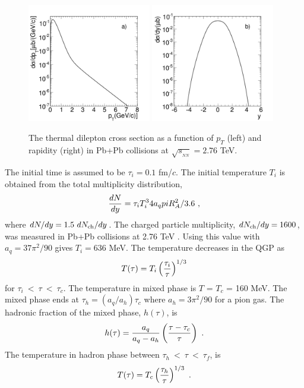 \begin{figure}
\includegraphics[width=0.48\textwidth]{chap_DiMuonContinuum_figures/Fig4a_ThPt}
\includegraphics[width=0.48\textwidth]{chap_DiMuonContinuum_figures/Fig4b_ThRap}

\caption{The thermal dilepton cross section as a function of $p_T$ 
(left) and rapidity (right) in Pb+Pb collisions at $\sqrt{s_{_{NN}}}= 2.76$ 
TeV.}
\label{Thermal}
\end{figure}

The initial time is assumed to be $\tau_i = 0.1$ fm/$c$. 
The initial temperature $T_i$ is obtained from
the total multiplicity distribution,
\begin{eqnarray}
{dN \over dy} = \tau_i T_i^3 4a_q \pi R_{A}^2/3.6 \, \, ,
\end{eqnarray}
where $dN/dy=1.5~dN_{\rm ch}/dy$. The charged particle multiplicity, 
$dN_{\rm ch}/dy = 1600$, was measured in Pb+Pb collisions 
at 2.76 TeV \cite{MULT}.  Using this value with $a_q = 37 \pi ^2 /90$ 
gives $T_i = 636$ MeV. 
The temperature decreases in the QGP as
\begin{eqnarray}
T(\tau) = T_i \left({\tau_i \over \tau}\right)^{1/3}
\end{eqnarray}
for $\tau_i~<~\tau~<~\tau_c$.  The temperature in mixed phase is 
$T$ = $T_c$ = 160 MeV. The mixed phase ends at $\tau_h = (a_q/a_h) \tau_c$
where $a_h = 3 \pi ^2 / 90$ for a pion gas.
The hadronic fraction of the mixed phase, $h(\tau)$, is
\begin{eqnarray}
h(\tau) ={a_q \over a_q - a_h}\left( {\tau -\tau_c \over \tau} \right) \,\, .
\end{eqnarray} 
The temperature in hadron phase between $\tau_h~<~\tau~<~\tau_f$,
is 
\begin{eqnarray}
T(\tau) = T_c \left({\tau_h \over \tau}\right)^{1/3} \, \, .
\end{eqnarray}

